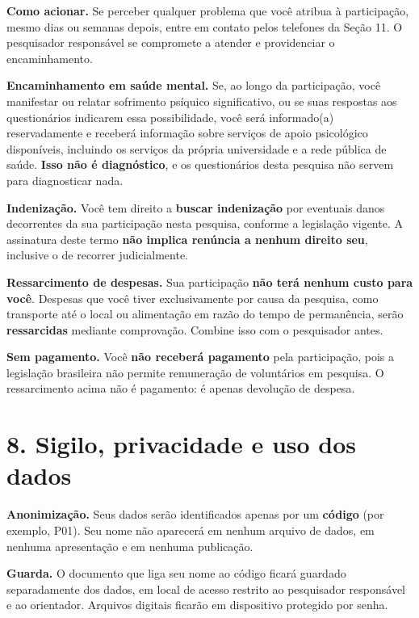 \documentclass[12pt,a4paper]{article}
\begin{document}
\textbf{Como acionar.} Se perceber qualquer problema que você atribua à
participação, mesmo dias ou semanas depois, entre em contato pelos telefones da
Seção 11. O pesquisador responsável se compromete a atender e providenciar o
encaminhamento.

\textbf{Encaminhamento em saúde mental.} Se, ao longo da participação, você
manifestar ou relatar sofrimento psíquico significativo, ou se suas respostas aos
questionários indicarem essa possibilidade, você será informado(a)
reservadamente e receberá informação sobre serviços de apoio psicológico
disponíveis, incluindo os serviços da própria universidade e a rede pública de
saúde. \textbf{Isso não é diagnóstico}, e os questionários desta pesquisa não
servem para diagnosticar nada.

\textbf{Indenização.} Você tem direito a \textbf{buscar indenização} por
eventuais danos decorrentes da sua participação nesta pesquisa, conforme a
legislação vigente. A assinatura deste termo \textbf{não implica renúncia a
nenhum direito seu}, inclusive o de recorrer judicialmente.

\textbf{Ressarcimento de despesas.} Sua participação \textbf{não terá nenhum
custo para você}. Despesas que você tiver exclusivamente por causa da pesquisa,
como transporte até o local ou alimentação em razão do tempo de permanência,
serão \textbf{ressarcidas} mediante comprovação. Combine isso com o pesquisador
antes.

\textbf{Sem pagamento.} Você \textbf{não receberá pagamento} pela participação,
pois a legislação brasileira não permite remuneração de voluntários em pesquisa.
O ressarcimento acima não é pagamento: é apenas devolução de despesa.

\section*{8. Sigilo, privacidade e uso dos dados}

\textbf{Anonimização.} Seus dados serão identificados apenas por um
\textbf{código} (por exemplo, P01). Seu nome não aparecerá em nenhum arquivo de
dados, em nenhuma apresentação e em nenhuma publicação.

\textbf{Guarda.} O documento que liga seu nome ao código ficará guardado
separadamente dos dados, em local de acesso restrito ao pesquisador responsável e
ao orientador. Arquivos digitais ficarão em dispositivo protegido por senha.
\end{document}
